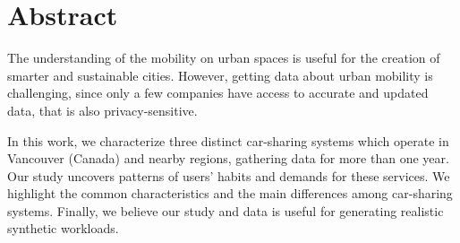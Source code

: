 \section{Abstract}
\label{sec:3_0_abstract}

The understanding of the mobility on urban spaces is useful for the creation of smarter and sustainable cities. However, getting data about urban mobility is challenging, since only a few companies have access to accurate and updated data, that is also privacy-sensitive. 

In this work, we characterize three distinct car-sharing systems which operate in Vancouver (Canada) and nearby regions, gathering data for more than one year. Our study uncovers patterns of users' habits and demands for these services. 
We highlight the common characteristics and the main differences among car-sharing systems. Finally, we believe our study and data is useful for generating realistic synthetic workloads.